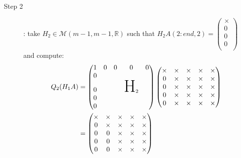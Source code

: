 \documentclass[computational_mathematics.tex]{subfiles}
\begin{document}
\begin{example}
\begin{description}
  \item[{\sc Step 2}]: take $H_{2} \in \mathcal{M}(m-1, m-1, \mathds{R})$ such that $H_{2}A(2:end, 2) = \begin{pmatrix} \times\\ 0\\ 0\\ 0\\ \end{pmatrix}$ and compute:
    \begin{equation}
      \begin{aligned}
        Q_2 (H_1 A)
        &= 
        \begin{pmatrix}
          1 & 0 & 0 & 0 & 0\\
          0 & & &\\
          0 && & \text{\Huge H}_2\\
          0 &&& \\
          0 &&&\\
        \end{pmatrix} 
        \begin{pmatrix}
          \times & \times & \times & \times & \times\\
          0 & \times & \times & \times & \times\\
          0 & \times & \times & \times & \times\\
          0 & \times & \times & \times & \times\\
          0 & \times & \times & \times & \times\\
        \end{pmatrix}\\
        &= \begin{pmatrix}
          \times & \times & \times & \times & \times\\
          0 & \times & \times & \times & \times\\
          0 & 0 & \times & \times & \times\\
          0 & 0 & \times & \times & \times\\
          0 & 0 & \times & \times & \times\\
        \end{pmatrix}
      \end{aligned}
    \end{equation}
    

\end{description}
\end{example}
\end{document}
